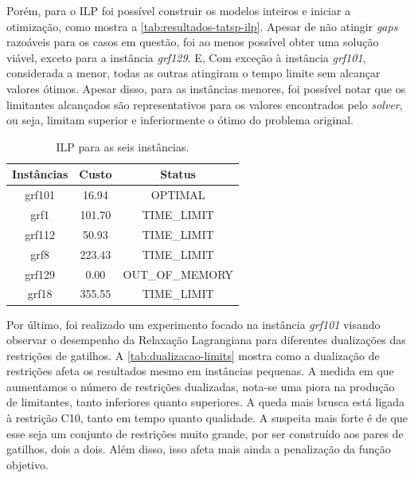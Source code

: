 Porém, para o ILP foi possível construir os modelos inteiros e iniciar a otimização, como mostra a \autoref{tab:resultados-tatsp-ilp}. Apesar de não atingir \emph{gaps} razoáveis para os casos em questão, foi ao menos possível obter uma solução viável, exceto para a instância \emph{grf129}. E, Com exceção à instância \emph{grf101}, considerada a menor, todas as outras atingiram o tempo limite sem alcançar valores ótimos. Apesar disso, para as instâncias menores, foi possível notar que os limitantes alcançados são representativos para os valores encontrados pelo \emph{solver}, ou seja, limitam superior e inferiormente o ótimo do problema original.


\begin{table}[H]
\centering
\begin{tabular}{|c|c|c|}
\hline
\textbf{Instâncias} & \textbf{Custo} & \textbf{Status} \\
\hline
grf101 & 16.94   & OPTIMAL      \\
grf1   & 101.70  & TIME\_LIMIT   \\
grf112 & 50.93   & TIME\_LIMIT   \\
grf8   & 223.43  & TIME\_LIMIT   \\
grf129 & 0.00    & OUT\_OF\_MEMORY \\
grf18  & 355.55  & TIME\_LIMIT   \\
\hline
\end{tabular}
\caption{ILP para as seis instâncias.}
\label{tab:resultados-tatsp-ilp}
\end{table}

Por último, foi realizado um experimento focado na instância \emph{grf101} visando observar o desempenho da Relaxação Lagrangiana para diferentes dualizações das restrições de gatilhos. A \autoref{tab:dualizacao-limits} mostra como a dualização de restrições afeta os resultados mesmo em instâncias pequenas. A medida em que aumentamos o número de restrições dualizadas, nota-se uma piora na produção de limitantes, tanto inferiores quanto superiores. A queda mais brusca está ligada à restrição C10, tanto em tempo quanto qualidade. A suspeita mais forte é de que esse seja um conjunto de restrições muito grande, por ser construído aos pares de gatilhos, dois a dois. Além disso, isso afeta mais ainda a penalização da função objetivo.

